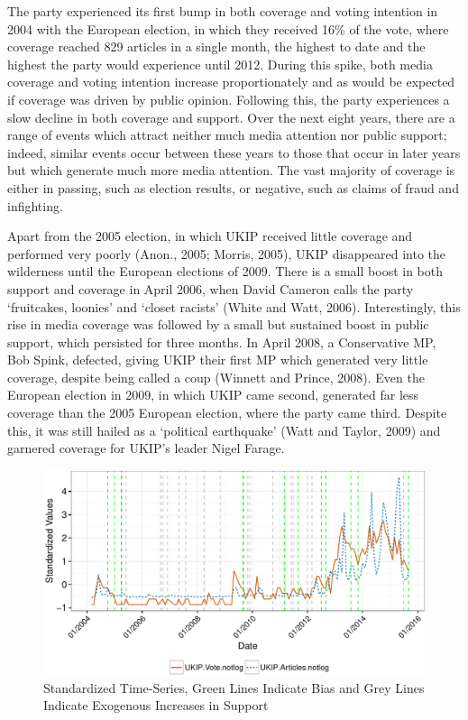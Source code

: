 \documentclass[12pt,article]{article}
\begin{document}
The party experienced its first bump in both coverage and voting
intention in 2004 with the European election, in which they received
16\% of the vote, where coverage reached 829 articles in a single month,
the highest to date and the highest the party would experience until
2012. During this spike, both media coverage and voting intention
increase proportionately and as would be expected if coverage was driven
by public opinion. Following this, the party experiences a slow decline
in both coverage and support. Over the next eight years, there are a
range of events which attract neither much media attention nor public
support; indeed, similar events occur between these years to those that
occur in later years but which generate much more media attention. The
vast majority of coverage is either in passing, such as election
results, or negative, such as claims of fraud and infighting.

Apart from the 2005 election, in which UKIP received little coverage and
performed very poorly (Anon., 2005; Morris, 2005), UKIP disappeared into
the wilderness until the European elections of 2009. There is a small
boost in both support and coverage in April 2006, when David Cameron
calls the party `fruitcakes, loonies' and `closet racists' (White and
Watt, 2006). Interestingly, this rise in media coverage was followed by
a small but sustained boost in public support, which persisted for three
months. In April 2008, a Conservative MP, Bob Spink, defected, giving
UKIP their first MP which generated very little coverage, despite being
called a coup (Winnett and Prince, 2008). Even the European election in
2009, in which UKIP came second, generated far less coverage than the
2005 European election, where the party came third. Despite this, it was
still hailed as a `political earthquake' (Watt and Taylor, 2009) and
garnered coverage for UKIP's leader Nigel Farage.

\begin{figure}[htbp]
\centering
\includegraphics{ukip_media_files/figure-latex/unnamed-chunk-7-1.pdf}
\caption{Standardized Time-Series, Green Lines Indicate Bias and Grey
Lines Indicate Exogenous Increases in Support}
\end{figure}
\end{document}
